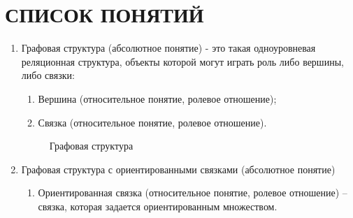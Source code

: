 \documentclass[a4paper]{article}
\begin{document}
\section{СПИСОК ПОНЯТИЙ}
\begin{enumerate}
  \item Графовая структура (абсолютное понятие) - это такая одноуровневая реляционная структура, объекты которой могут играть роль либо вершины, либо связки:
    \begin{enumerate}
      \item Вершина (относительное понятие, ролевое отношение);
      \item Связка (относительное понятие, ролевое отношение).
    \end{enumerate}
    \begin{figure}[h]
      \caption{Графовая структура}
    \end{figure}
  \item Графовая структура с ориентированными связками (абсолютное понятие)
    \begin{enumerate}
      \item Ориентированная связка (относительное понятие, ролевое отношение) – связка, которая задается ориентированным множеством.
    \end{enumerate}
    \begin{figure}[!ht]

\end{figure}
\end{enumerate}
\end{document}
